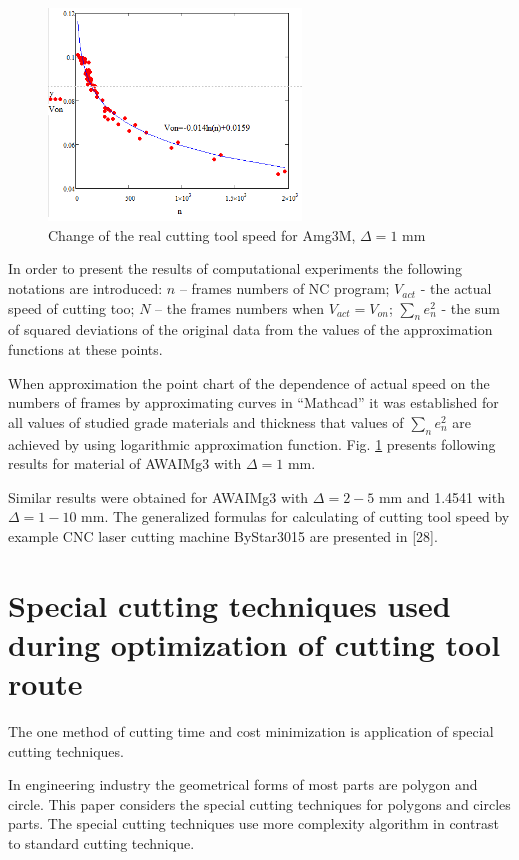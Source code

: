 \documentclass[runningheads]{llncs}
\begin{document}
\begin{figure}
  \begin{center}
  \includegraphics[width=0.6\textwidth]{plot.png}
  \caption{Change of the real cutting tool speed for Amg3M, $\Delta=1$ mm}
  \label{plot}
  \end{center}
\end{figure}

In order to present the results of computational experiments
the following notations are introduced:
$n$ – frames numbers of NC program;
$V_{act}$ - the actual speed of cutting too;
$N$ – the frames numbers when $V_{act}=V_{on}$;
$\sum_n e_n^2$  - the sum of squared deviations of the
original data from the values of the approximation functions at these points.

When approximation the point chart
of the dependence of actual speed
on the numbers of frames by approximating curves in ``Mathcad''
it was established for all values of studied grade materials
and thickness that values of $\sum_n e_n^2$
are achieved by using logarithmic approximation function.
Fig. \ref{plot} presents following results for material of AWAIMg3 with $\Delta=1$ mm.

Similar results were obtained for AWAIMg3 with $\Delta=2-5$ mm
and 1.4541 with $\Delta=1-10$ mm.
The generalized formulas for calculating of cutting tool speed
by example CNC laser cutting machine ByStar3015 are presented in [28].

\section{Special cutting techniques used during optimization of cutting tool route}

The one method of cutting time and cost minimization is application of special cutting techniques.

In engineering industry the geometrical forms of most parts are polygon and circle.
This paper considers the special cutting techniques for polygons and circles parts.
The special cutting techniques use more complexity algorithm in contrast to standard cutting technique.
\end{document}
